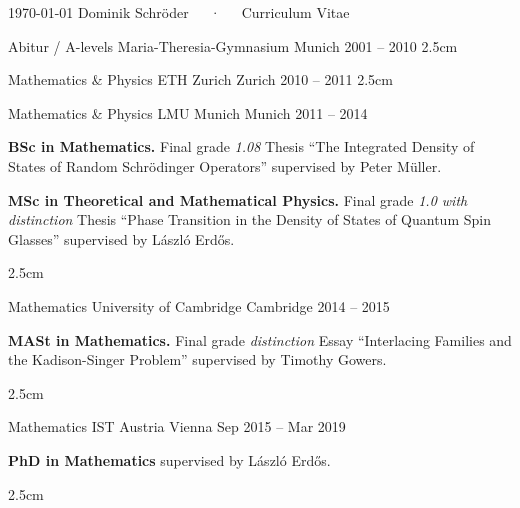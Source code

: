 \documentclass[11pt, a4paper]{awesome-cv}
\begin{document}
\makecvheader[R]

\makecvfooter
  {\today}
  {Dominik Schröder~~~·~~~Curriculum Vitae}
  {\thepage}



\begin{cventries}
  \cventry 
    {Abitur / A-levels} %
    {Maria-Theresia-Gymnasium} %
    {Munich} %
    {2001 -- 2010} %
    {}
    {2.5cm}

  \cventry
    {Mathematics \& Physics}
    {ETH Zurich}
    {Zurich}
    {2010 -- 2011} 
    {}
    {2.5cm}

\cventry
    {Mathematics \& Physics}
    {LMU Munich}
    {Munich}
    {2011 -- 2014}
    {
      \begin{cvitems}
        \item {\textbf{{\color{awesome}BSc} in Mathematics.} {\color{awesome}Final grade \emph{1.08}}\newline
        Thesis ``The Integrated Density of States of Random Schrödinger Operators'' supervised by Peter Müller.}
        \item {\textbf{{\color{awesome}MSc} in Theoretical and Mathematical Physics.} {\color{awesome}Final grade \emph{1.0 with distinction}}\newline 
        Thesis ``Phase Transition in the Density of States of Quantum Spin Glasses'' supervised by L\'aszl\'o Erd\H{o}s.}
      \end{cvitems}
    }
    {2.5cm}

  \cventry
    {Mathematics}
    {University of Cambridge}
    {Cambridge}
    {2014 -- 2015}
    {
      \begin{cvitems}
        \item {\textbf{{{\color{awesome}MASt} in Mathematics.}} {\color{awesome}Final grade \emph{distinction}}\newline 
        Essay ``Interlacing Families and the Kadison-Singer Problem'' supervised by Timothy Gowers.} 
      \end{cvitems}
    }
    {2.5cm}

  \cventry
    {Mathematics} %
    {IST Austria} %
    {Vienna} %
    {Sep 2015 -- Mar 2019} %
    {
      \begin{cvitems} %
        \item {\textbf{{{\color{awesome}PhD} in Mathematics}} supervised by L\'aszl\'o Erd\H{o}s.}
      \end{cvitems}
    }
    {2.5cm}
\end{cventries}
\end{document}

